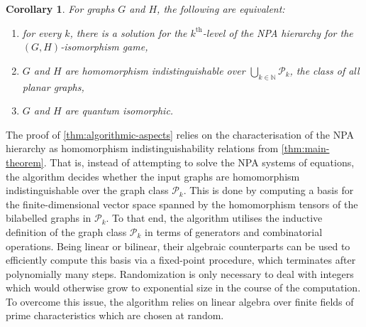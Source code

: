 \documentclass[a4paper,onecolumn,11pt,accepted=2026-01-06]{quantumarticle}
\theoremstyle{plain}
\newtheorem{cor}[thm]{Corollary}
\theoremstyle{remark}
\theoremstyle{definition}
\begin{document}
\begin{cor}\label{thm:quant-iso}
	For graphs $G$ and $H$, the following are equivalent:
	\begin{enumerate}
		\item for every $k$, there is a solution for the $k^{\text{th}}$-level of the NPA hierarchy for the $(G,H)$-isomor\-phism game,
		\item $G$ and $H$ are homomorphism indistinguishable over $\bigcup_{k \in \mathbb{N}} \mathcal{P}_k$, the class of all planar graphs,
		\item $G$ and $H$ are quantum isomorphic.
	\end{enumerate}
\end{cor}

The proof of \cref{thm:algorithmic-aspects} relies on the characterisation of the NPA hierarchy as homomorphism indistinguishability relations from \cref{thm:main-theorem}.
That is, instead of attempting to solve the NPA systems of equations, the algorithm decides whether the input graphs are homomorphism indistinguishable over the graph class $\mathcal{P}_k$.
This is done by computing a basis for the finite-dimensional vector space spanned by the homomorphism tensors %
of the bilabelled graphs in $\mathcal{P}_k$. To that end, the algorithm utilises the inductive definition of the graph class $\mathcal{P}_k$ in terms of generators and combinatorial operations. 
Being linear or bilinear, their algebraic counterparts can be used to efficiently compute this basis via a fixed-point procedure, which terminates after polynomially many steps. 
Randomization is only necessary to deal with integers which would otherwise grow to exponential size in the course of the computation.
To overcome this issue, the algorithm relies on linear algebra over finite fields of prime characteristics which are chosen at random.
\end{document}
